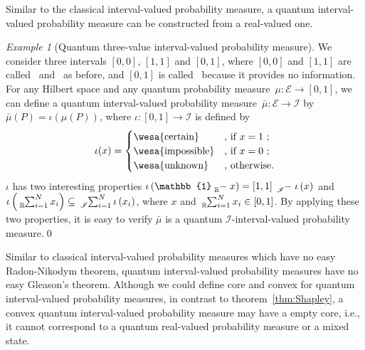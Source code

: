 \documentclass{article}
\theoremstyle{remark}
\newtheorem{example}{Example}
\newcommand{\events}{\ensuremath{\mathcal{E}}}
\newcommand{\imposs}{{\mbox{\wesa{impossible}}}}
\newcommand{\necess}{{\mbox{\wesa{certain}}}}
\newcommand{\unknown}{{\mbox{\wesa{unknown}}}}
\begin{document}
Similar to the classical interval-valued probability measure, a quantum
interval-valued probability measure can be constructed from a real-valued
one. 

\begin{example}[Quantum three-value interval-valued probability
measure] We consider three intervals\emph{ }$\left[0,0\right]$,
$\left[1,1\right]$ and \emph{$\left[0,1\right]$}, where $\left[0,0\right]$
and $\left[1,1\right]$ are called \imposs~and \necess~as before,
and \emph{$\left[0,1\right]$} is called \unknown~because it provides
no information. For any Hilbert space and any quantum probability
measure~$\mu:\events\rightarrow\left[0,1\right]$, we can define
a quantum interval-valued probability measure~$\bar{\mu}:\events\rightarrow\mathscr{I}$
by $\bar{\mu}(P)=\iota\left(\mu(P)\right)$, where $\iota:\left[0,1\right]\rightarrow\mathscr{I}$
is defined by 
\[
\iota(x)=\begin{cases}
\necess & \textrm{, if }x=1\textrm{ ;}\\
\imposs & \textrm{, if }x=0\textrm{ ;}\\
\unknown & \textrm{, otherwise.}
\end{cases}
\]
$\iota$ has two interesting properties $\iota\left(\mathbb{1}\tensor*[_{\mathbb{R}}]{-}{}x\right)=\left[1,1\right]\tensor*[_{\mathscr{I}}]{-}{}\iota\left(x\right)$
and $\iota\left(\tensor*[_{\mathbb{R}}]{\sum}{_{i=1}^{N}}x_{i}\right)\subseteq\tensor*[_{\mathscr{I}}]{\sum}{_{i=1}^{N}}\iota\left(x_{i}\right)$,
where $x$ and $\tensor*[_{\mathbb{R}}]{\sum}{_{i=1}^{N}}x_{i}\in\left[0,1\right]$.
By applying these two properties, it is easy to verify $\bar{\mu}$
is a quantum \emph{$\mathscr{I}$}-interval-valued probability measure.\qed\end{example}

Similar to classical interval-valued probability measures which have
no easy Radon-Nikodym theorem, quantum interval-valued probability
measures have no easy Gleason's theorem. Although we could define
core and convex for quantum interval-valued probability measures,
in contrast to theorem~\ref{thm:Shapley}, a convex quantum interval-valued
probability measure may have a empty core, i.e., it cannot correspond
to a quantum real-valued probability measure or a mixed state.
\end{document}
